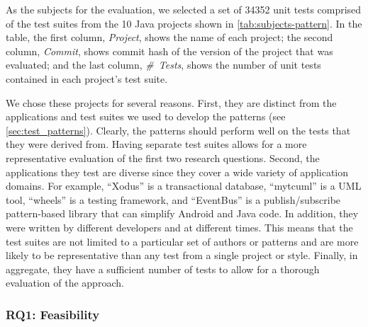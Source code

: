 \documentclass[proposal.tex]{subfiles}
\begin{document}
As the subjects for the evaluation, we selected a set of \num{34352} unit tests comprised of the test suites from the \num{10} Java projects shown in \cref{tab:subjects-pattern}.
%
In the table, the first column, \emph{Project}, shows the name of each project; the second column, \emph{Commit}, shows commit hash of the version of the project that was evaluated; and the last column, \emph{\#~Tests}, shows the number of unit tests contained in each project's test suite.


We chose these projects for several reasons.
%
First, they are distinct from the applications and test suites we used to develop the patterns (see \cref{sec:test_patterns}).
%
Clearly, the patterns should perform well on the tests that they were derived from.
%
Having separate test suites allows for a more representative evaluation of the first two research questions.
%
Second, the applications they test are diverse since they cover a wide variety of application domains.
%
For example, \enquote{Xodus} is a transactional database, \enquote{mytcuml} is a UML tool, \enquote{wheels} is a testing framework, and \enquote{EventBus} is a publish\slash subscribe pattern-based library that can simplify Android and Java code.
%
In addition, they were written by different developers and at different times.
%
This means that the test suites are not limited to a particular set of authors or patterns and are more likely to be representative than any test from a single project or style.
%
Finally, in aggregate, they have a sufficient number of tests to allow for a thorough evaluation of the approach.


\subsubsection{RQ1: Feasibility}
\label{sec:evaluation:feasibility}
\end{document}
